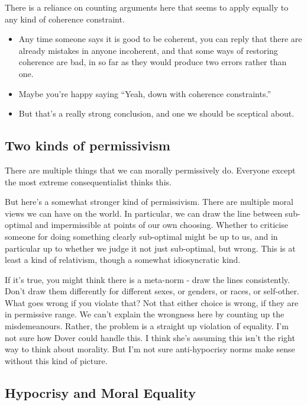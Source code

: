 \documentclass[
]{article}
\providecommand{\tightlist}{%
  \setlength{\itemsep}{0pt}\setlength{\parskip}{0pt}}
\begin{document}
There is a reliance on counting arguments here that seems to apply
equally to any kind of coherence constraint.

\begin{itemize}
\tightlist
\item
  Any time someone says it is good to be coherent, you can reply that
  there are already mistakes in anyone incoherent, and that some ways of
  restoring coherence are bad, in so far as they would produce two
  errors rather than one.
\item
  Maybe you're happy saying ``Yeah, down with coherence constraints.''
\item
  But that's a really strong conclusion, and one we should be sceptical
  about.
\end{itemize}

\hypertarget{two-kinds-of-permissivism}{%
\subsection{Two kinds of permissivism}\label{two-kinds-of-permissivism}}

There are multiple things that we can morally permissively do. Everyone
except the most extreme consequentialist thinks this.

But here's a somewhat stronger kind of permissivism. There are multiple
moral views we can have on the world. In particular, we can draw the
line between sub-optimal and impermissible at points of our own
choosing. Whether to criticise someone for doing something clearly
sub-optimal might be up to us, and in particular up to whether we judge
it not just sub-optimal, but wrong. This is at least a kind of
relativism, though a somewhat idiosyncratic kind.

If it's true, you might think there is a meta-norm - draw the lines
consistently. Don't draw them differently for different sexes, or
genders, or races, or self-other. What goes wrong if you violate that?
Not that either choice is wrong, if they are in permissive range. We
can't explain the wrongness here by counting up the misdemeanours.
Rather, the problem is a straight up violation of equality. I'm not sure
how Dover could handle this. I think she's assuming this isn't the right
way to think about morality. But I'm not sure anti-hypocrisy norms make
sense without this kind of picture.

\hypertarget{hypocrisy-and-moral-equality}{%
\subsection{Hypocrisy and Moral
Equality}\label{hypocrisy-and-moral-equality}}
\end{document}
